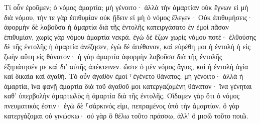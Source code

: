 \documentclass{openreader}
\begin{document}
Τί οὖν ἐροῦμεν; ὁ νόμος ἁμαρτία; μὴ γένοιτο· ἀλλὰ τὴν ἁμαρτίαν οὐκ ἔγνων εἰ μὴ διὰ νόμου, τήν τε γὰρ ἐπιθυμίαν οὐκ ᾔδειν εἰ μὴ ὁ νόμος ἔλεγεν· Οὐκ ἐπιθυμήσεις· 
ἀφορμὴν δὲ λαβοῦσα ἡ ἁμαρτία διὰ τῆς ἐντολῆς κατειργάσατο ἐν ἐμοὶ πᾶσαν ἐπιθυμίαν, χωρὶς γὰρ νόμου ἁμαρτία νεκρά. 
ἐγὼ δὲ ἔζων χωρὶς νόμου ποτέ· ἐλθούσης δὲ τῆς ἐντολῆς ἡ ἁμαρτία ἀνέζησεν, 
ἐγὼ δὲ ἀπέθανον, καὶ εὑρέθη μοι ἡ ἐντολὴ ἡ εἰς ζωὴν αὕτη εἰς θάνατον· 
ἡ γὰρ ἁμαρτία ἀφορμὴν λαβοῦσα διὰ τῆς ἐντολῆς ἐξηπάτησέν με καὶ δι’ αὐτῆς ἀπέκτεινεν. 
ὥστε ὁ μὲν νόμος ἅγιος, καὶ ἡ ἐντολὴ ἁγία καὶ δικαία καὶ ἀγαθή. 
Τὸ οὖν ἀγαθὸν ἐμοὶ ⸀ἐγένετο θάνατος; μὴ γένοιτο· ἀλλὰ ἡ ἁμαρτία, ἵνα φανῇ ἁμαρτία διὰ τοῦ ἀγαθοῦ μοι κατεργαζομένη θάνατον· ἵνα γένηται καθ’ ὑπερβολὴν ἁμαρτωλὸς ἡ ἁμαρτία διὰ τῆς ἐντολῆς. 
Οἴδαμεν γὰρ ὅτι ὁ νόμος πνευματικός ἐστιν· ἐγὼ δὲ ⸀σάρκινός εἰμι, πεπραμένος ὑπὸ τὴν ἁμαρτίαν. 
ὃ γὰρ κατεργάζομαι οὐ γινώσκω· οὐ γὰρ ὃ θέλω τοῦτο πράσσω, ἀλλ’ ὃ μισῶ τοῦτο ποιῶ. 
\end{document}
